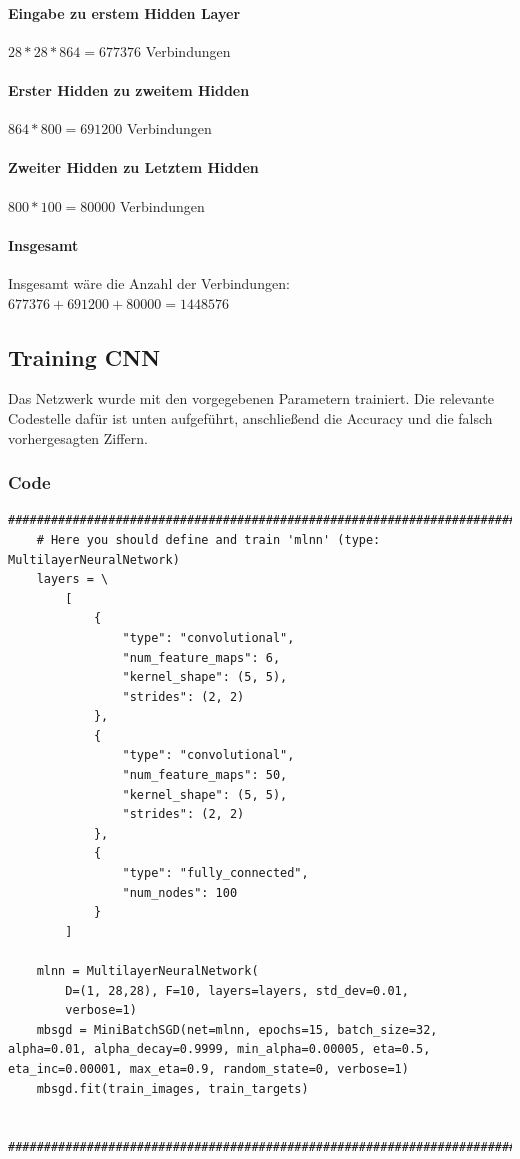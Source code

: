 \documentclass{article}
\begin{document}
\paragraph{Eingabe zu erstem Hidden Layer}
$28 * 28 * 864 = 677376$ Verbindungen
\paragraph{Erster Hidden zu zweitem Hidden}
$864 * 800 = 691200$ Verbindungen
\paragraph{Zweiter Hidden zu Letztem Hidden}
$800 * 100 = 80000$ Verbindungen
\paragraph{Insgesamt}
Insgesamt wäre die Anzahl der Verbindungen: $677376 + 691200 + 80000 = 1448576$

\subsection{Training CNN}
Das Netzwerk wurde mit den vorgegebenen Parametern trainiert. Die relevante Codestelle dafür ist unten aufgeführt, anschließend die Accuracy und die falsch vorhergesagten Ziffern.

\subsubsection{Code}
\begin{lstlisting}[title=Train CVNN]
    ############################################################################
    # Here you should define and train 'mlnn' (type: MultilayerNeuralNetwork)
    layers = \
        [
            {
                "type": "convolutional",
                "num_feature_maps": 6,
                "kernel_shape": (5, 5),
                "strides": (2, 2)
            },
            {
                "type": "convolutional",
                "num_feature_maps": 50,
                "kernel_shape": (5, 5),
                "strides": (2, 2)
            },
            {
                "type": "fully_connected",
                "num_nodes": 100
            }
        ]
    
    mlnn = MultilayerNeuralNetwork(
        D=(1, 28,28), F=10, layers=layers, std_dev=0.01,
        verbose=1)
    mbsgd = MiniBatchSGD(net=mlnn, epochs=15, batch_size=32, alpha=0.01, alpha_decay=0.9999, min_alpha=0.00005, eta=0.5, eta_inc=0.00001, max_eta=0.9, random_state=0, verbose=1)
    mbsgd.fit(train_images, train_targets)

    ############################################################################
\end{lstlisting}
\end{document}
